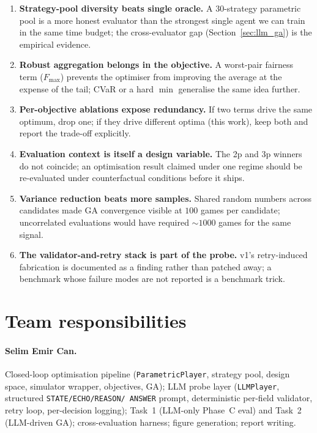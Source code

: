 \documentclass[10pt]{article}
\begin{document}
\begin{enumerate}[leftmargin=1.4em,itemsep=1pt]
\item \textbf{Strategy-pool diversity beats single oracle.} A
$30$-strategy parametric pool is a more honest evaluator than the
strongest single agent we can train in the same time budget; the
cross-evaluator gap (Section~\ref{sec:llm_ga}) is the empirical
evidence.
\item \textbf{Robust aggregation belongs in the objective.} A
worst-pair fairness term ($F_{\max}$) prevents the optimiser from
improving the average at the expense of the tail; CVaR or a hard
$\min$ generalise the same idea further.
\item \textbf{Per-objective ablations expose redundancy.} If two terms
drive the same optimum, drop one; if they drive different optima
(this work), keep both and report the trade-off explicitly.
\item \textbf{Evaluation context is itself a design variable.} The 2p
and 3p winners do not coincide; an optimisation result claimed under
one regime should be re-evaluated under counterfactual conditions
before it ships.
\item \textbf{Variance reduction beats more samples.} Shared random
numbers across candidates made GA convergence visible at $100$ games
per candidate; uncorrelated evaluations would have required
$\sim 1000$ games for the same signal.
\item \textbf{The validator-and-retry stack is part of the probe.}
v1's retry-induced fabrication is documented as a finding rather than
patched away; a benchmark whose failure modes are not reported is a
benchmark trick.
\end{enumerate}

\section{Team responsibilities}\label{sec:team}

\paragraph{Selim Emir Can.} %
Closed-loop optimisation pipeline (\texttt{ParametricPlayer}, strategy
pool, design space, simulator wrapper, objectives, GA); LLM probe
layer (\texttt{LLMPlayer}, structured \texttt{STATE/ECHO/REASON/
ANSWER} prompt, deterministic per-field validator, retry loop,
per-decision logging); Task~1 (LLM-only Phase~C eval) and Task~2
(LLM-driven GA); cross-evaluation harness; figure generation; report
writing.
\end{document}
